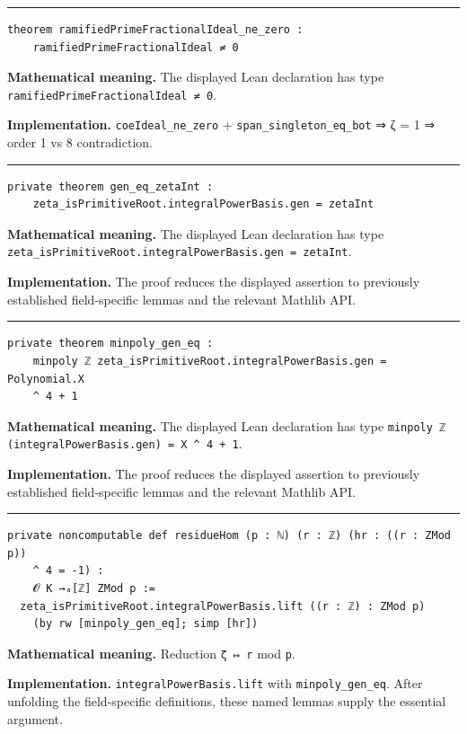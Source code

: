 \documentclass[UTF8,a4paper,11pt,fontset=fandol]{ctexart}
\theoremstyle{definition}
\newcommand{\statementsep}{\par\medskip\hrule\medskip}
\begin{document}
\statementsep
\begin{verbatim}
theorem ramifiedPrimeFractionalIdeal_ne_zero :
    ramifiedPrimeFractionalIdeal ≠ 0
\end{verbatim}
\noindent\textbf{Mathematical meaning.} The displayed Lean declaration has type \texttt{ramifiedPrimeFractionalIdeal ≠ 0}.\par
\noindent\textbf{Implementation.} \texttt{coeIdeal\_\allowbreak{}ne\_\allowbreak{}zero} + \texttt{span\_\allowbreak{}singleton\_\allowbreak{}eq\_\allowbreak{}bot} ⇒ ζ = 1 ⇒ order 1 vs 8 contradiction.\par
\statementsep
\begin{verbatim}
private theorem gen_eq_zetaInt :
    zeta_isPrimitiveRoot.integralPowerBasis.gen = zetaInt
\end{verbatim}
\noindent\textbf{Mathematical meaning.} The displayed Lean declaration has type \texttt{zeta\_\allowbreak{}isPrimitiveRoot.\allowbreak{}integralPowerBasis.\allowbreak{}gen = zetaInt}.\par
\noindent\textbf{Implementation.} The proof reduces the displayed assertion to previously established field-specific lemmas and the relevant Mathlib API.\par
\statementsep
\begin{verbatim}
private theorem minpoly_gen_eq :
    minpoly ℤ zeta_isPrimitiveRoot.integralPowerBasis.gen = Polynomial.X
    ^ 4 + 1
\end{verbatim}
\noindent\textbf{Mathematical meaning.} The displayed Lean declaration has type \texttt{minpoly ℤ (integralPowerBasis.\allowbreak{}gen) = X \textasciicircum{} 4 + 1}.\par
\noindent\textbf{Implementation.} The proof reduces the displayed assertion to previously established field-specific lemmas and the relevant Mathlib API.\par
\statementsep
\begin{verbatim}
private noncomputable def residueHom (p : ℕ) (r : ℤ) (hr : ((r : ZMod p))
    ^ 4 = -1) :
    𝓞 K →ₐ[ℤ] ZMod p :=
  zeta_isPrimitiveRoot.integralPowerBasis.lift ((r : ℤ) : ZMod p)
    (by rw [minpoly_gen_eq]; simp [hr])
\end{verbatim}
\noindent\textbf{Mathematical meaning.} Reduction \texttt{ζ ↦ r} mod \texttt{p}.\par
\noindent\textbf{Implementation.} \texttt{integralPowerBasis.\allowbreak{}lift} with \texttt{minpoly\_\allowbreak{}gen\_\allowbreak{}eq}. After unfolding the field-specific definitions, these named lemmas supply the essential argument.\par
\end{document}
